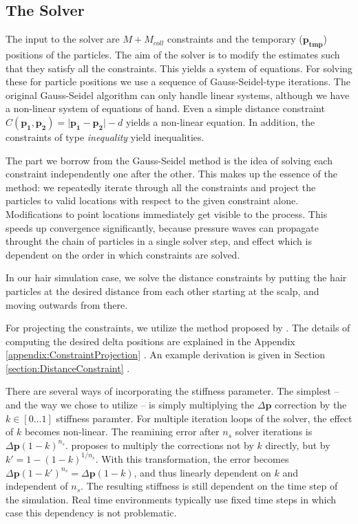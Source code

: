 \documentclass[sigplan,screen,nonacm]{acmart}
\renewcommand{\b}{\boldsymbol}
\begin{document}
\subsection{The Solver}
\label{sec:solver}
The input to the solver are $M + M_{coll}$ constraints and the temporary
($\b{p_{tmp}}$) positions of the particles. The aim of the solver is to modify
the estimates such that they satisfy all the constraints. This yields a system
of equations. For solving these for particle positions we use
a sequence of Gauss-Seidel-type iterations. The original Gauss-Seidel algorithm
can only handle linear systems, although we have a non-linear system of
equations of hand. Even a simple distance constraint $ C(\b{p_1}, \b{p_2})
= \lvert \b{p_1} - \b{p_2} \rvert - d $ yields a non-linear equation. In
addition, the constraints of type \emph{inequality} yield inequalities.

The part we borrow from the Gauss-Seidel method is the idea of solving each
constraint independently one after the other. This makes up the essence of the
method: we repeatedly iterate through all the constraints and project the
particles to valid locations with respect to the given constraint alone.
Modifications to point locations immediately get visible to the process. This
speeds up convergence significantly, because pressure waves can propagate
throught the chain of particles in a single solver step, and effect which is
dependent on the order in which constraints are solved. 

In our hair simulation case, we solve the distance constraints by putting the
hair particles at the desired distance from each other starting at the scalp,
and moving outwards from there.

For projecting the constraints, we utilize the method proposed by
\citet{MullerPBD}. The details of computing the desired delta positions are
explained in the Appendix \ref{appendix:ConstraintProjection}
. An example derivation is given in
Section \ref{section:DistanceConstraint} .

There are several ways of incorporating the stiffness parameter. The simplest
-- and the way we chose to utilize -- is simply multiplying the $\Delta \b{p}$
correction by the $k \in [0 \ldots 1]$ stiffness paramter. For multiple
iteration loops of the solver, the effect of $k$ becomes non-linear. The
reamining error after $n_s$ solver iterations is $\Delta \b{p}(1-k)^{n_s}$.
\citet{MullerPBD} proposes to multiply the corrections not by $k$ directly, but
by $k' = 1 - (1-k)^{1/n_s}$. With this transformation, the error becomes $\Delta
\b{p}(1-k')^{n_s} = \Delta\b{p}(1-k)$, and thus linearly dependent on $k$ and
independent of $n_s$. The resulting stiffness is still dependent on the time
step of the simulation. Real time environments typically use fixed time steps in
which case this dependency is not problematic.
\end{document}
